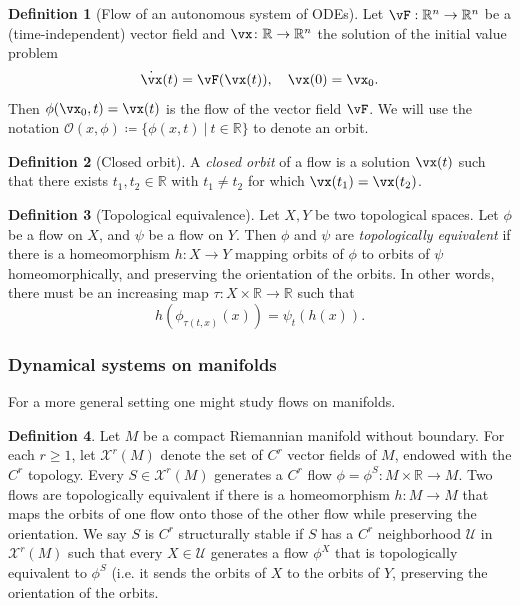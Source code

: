 \documentclass{article}
\theoremstyle{definition}
\newtheorem{definition}{Definition}
\theoremstyle{remark}
\newcommand{\reals}{\mathbb{R}}
\newcommand{\mcU}{\mathcal{U}}
\newcommand{\mcX}{\mathcal{X}}
\newcounter{ct}
\begin{document}
\begin{definition}[Flow of an autonomous system of ODEs]
Let $\vF: \reals^n\rightarrow \reals^n$ be a (time-independent) vector field and $\vx\colon\reals\rightarrow\reals^n$  the solution of the initial value problem
\[
\dot\vx(t) =  \vF(\vx(t)), \ \ \ \vx(0) = \vx_0.
\]
Then $ \phi (\vx_{0},t)=\vx(t)$ is the flow of the vector field $\vF$.
We will use the notation $\mathcal {O}(x,\phi)\coloneqq \{\phi(x,t)\ |\ t\in\reals\}$ to denote an orbit.
\end{definition}


\begin{definition}[Closed orbit]
A \emph{closed orbit} of a flow is a solution $\vx(t)$ such that there exists $t_1, t_2\in\reals$ with  $t_1\neq t_2$ for which $\vx(t_1) = \vx(t_2)$.
\end{definition}

\begin{definition}[Topological equivalence]
Let $X,Y$ be two topological spaces. Let $\phi$ be a flow on $X$, and $\psi$ be a flow on $Y$.
Then $\phi$ and $\psi$ are \emph{topologically equivalent} if there is a homeomorphism $h\colon X\to Y$ mapping orbits of  $\phi$  to orbits of $\psi$  homeomorphically, and preserving the orientation of the orbits. In other words, there must be  an increasing map $\tau\colon X\times\reals\rightarrow\reals$ such that 
\begin{equation}\label{eq:topeq}
h(\phi_{\tau(t,x)}(x)) = \psi_t(h(x)).
\end{equation}
\end{definition}


\subsubsection{Dynamical systems on manifolds}
For a more general setting one might study flows on manifolds.
\begin{definition}
Let $M$ be a compact Riemannian manifold without boundary. For each $r\geq 1$, let $\mcX^r(M)$ denote the set of $C^r$ vector fields of $M$, endowed with the $C^r$ topology. Every $S\in \mcX^r(M)$ generates a $C^r$ flow $\phi=\phi^S\colon M\times \reals\rightarrow M$.
Two flows are topologically equivalent if there is a homeomorphism $h\colon M\rightarrow M$ that maps the orbits of one flow onto those of the other flow while preserving the orientation. 
 We say $S$ is $C^r$ structurally stable if $S$ has a $C^r$ neighborhood $\mcU$ in $\mcX^r(M)$ such that every $X \in \mcU$ generates a flow $\phi^X$ that is topologically equivalent to $\phi^S$ (i.e. it sends the orbits of $X$ to the orbits of $Y$, preserving the orientation of the orbits.
\end{definition}
\end{document}
